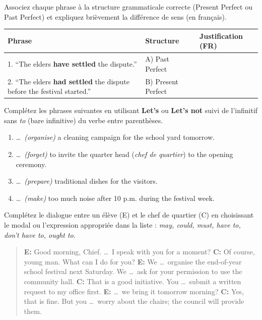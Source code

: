 \documentclass[11pt]{article}
\newcounter{popsec}
\newcounter{popsub}
\newcommand{\courssub}[1]{%
  \stepcounter{popsub}%
  \par\vspace{9pt}\noindent{\popxbold\fontsize{11.5}{13}\selectfont\color{popink}{\color{poporange}\thepopsec.\thepopsub}\hspace{6pt}#1}\par\nopagebreak\vspace{4pt}
}
\begin{document}
\begin{exercice}
Associez chaque phrase à la structure grammaticale correcte (Present Perfect ou Past Perfect) et expliquez brièvement la différence de sens (en français).

\begin{center}
\begin{tabularx}{\linewidth}{|l|X|X|}\hline
\textbf{Phrase} & \textbf{Structure} & \textbf{Justification (FR)} \\ \hline
1. ``The elders \textbf{have settled} the dispute.'' & A) Past Perfect & \\ \hline
2. ``The elders \textbf{had settled} the dispute before the festival started.'' & B) Present Perfect & \\ \hline
\end{tabularx}
\end{center}
\end{exercice}

\begin{exercice}
Complétez les phrases suivantes en utilisant \textbf{Let's} ou \textbf{Let's not} suivi de l'infinitif sans \emph{to} (bare infinitive) du verbe entre parenthèses.

\begin{enumerate}
\item \dots\ \emph{(organise)} a cleaning campaign for the school yard tomorrow.
\item \dots\ \emph{(forget)} to invite the quarter head (\emph{chef de quartier}) to the opening ceremony.
\item \dots\ \emph{(prepare)} traditional dishes for the visitors.
\item \dots\ \emph{(make)} too much noise after 10 p.m. during the festival week.
\end{enumerate}
\end{exercice}

\courssub{Je m'entraîne}

\begin{exercice}
Complétez le dialogue entre un élève (E) et le chef de quartier (C) en choisissant le modal ou l'expression appropriée dans la liste : \emph{may, could, must, have to, don't have to, ought to}.

\begin{quote}
\textbf{E:} Good morning, Chief. \dots\ I speak with you for a moment?
\textbf{C:} Of course, young man. What can I do for you?
\textbf{E:} We \dots\ organise the end-of-year school festival next Saturday. We \dots\ ask for your permission to use the community hall.
\textbf{C:} That is a good initiative. You \dots\ submit a written request to my office first.
\textbf{E:} \dots\ we bring it tomorrow morning?
\textbf{C:} Yes, that is fine. But you \dots\ worry about the chairs; the council will provide them.
\end{quote}
\end{exercice}
\end{document}
